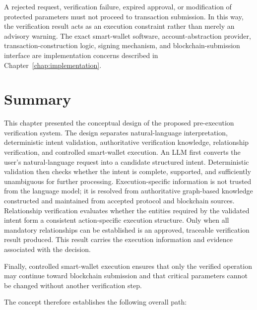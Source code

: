 A rejected request, verification failure, expired approval, or modification
of protected parameters must not proceed to transaction submission. In this
way, the verification result acts as an execution constraint rather than
merely an advisory warning. The exact smart-wallet software,
account-abstraction provider, transaction-construction logic, signing
mechanism, and blockchain-submission interface are implementation concerns
described in Chapter~\ref{chap:implementation}.


\section{Summary}
\label{sec:concept_summary}

This chapter presented the conceptual design of the proposed pre-execution
verification system. The design separates natural-language interpretation,
deterministic intent validation, authoritative verification knowledge,
relationship verification, and controlled smart-wallet execution. An LLM first converts the user's natural-language request into a candidate
structured intent. Deterministic validation then checks whether the intent is
complete, supported, and sufficiently unambiguous for further processing.
Execution-specific information is not trusted from the language model; it is
resolved from authoritative graph-based knowledge constructed and maintained
from accepted protocol and blockchain sources. Relationship verification evaluates whether the entities required by the
validated intent form a consistent action-specific execution structure. Only
when all mandatory relationships can be established is an approved,
traceable verification result produced. This result carries the execution
information and evidence associated with the decision.

Finally, controlled smart-wallet execution ensures that only the verified
operation may continue toward blockchain submission and that critical
parameters cannot be changed without another verification step.

The concept therefore establishes the following overall path:

